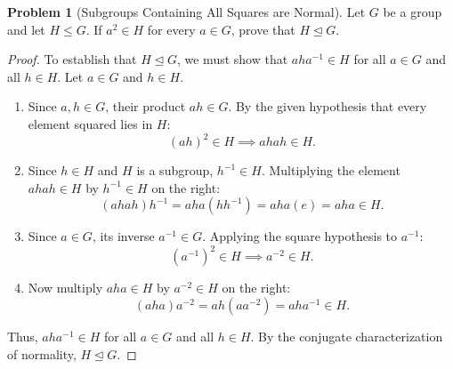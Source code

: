 \documentclass[12pt]{article}
\theoremstyle{definition}
\newtheorem{problem}[definition]{Problem}
\theoremstyle{plain}
\begin{document}
\begin{problem}[Subgroups Containing All Squares are Normal]
Let $G$ be a group and let $H \le G$. If $a^2 \in H$ for every $a \in G$, prove that $H \trianglelefteq G$.
\end{problem}
\begin{proof}
To establish that $H \trianglelefteq G$, we must show that $aha^{-1} \in H$ for all $a \in G$ and all $h \in H$.
Let $a \in G$ and $h \in H$.
\begin{enumerate}
    \item Since $a, h \in G$, their product $ah \in G$. By the given hypothesis that every element squared lies in $H$:
    \[
    (ah)^2 \in H \implies ahah \in H.
    \]
    
    \item Since $h \in H$ and $H$ is a subgroup, $h^{-1} \in H$.
    Multiplying the element $ahah \in H$ by $h^{-1} \in H$ on the right:
    \[
    (ahah)h^{-1} = aha(hh^{-1}) = aha(e) = aha \in H.
    \]
    
    \item Since $a \in G$, its inverse $a^{-1} \in G$. Applying the square hypothesis to $a^{-1}$:
    \[
    (a^{-1})^2 \in H \implies a^{-2} \in H.
    \]
    
    \item Now multiply $aha \in H$ by $a^{-2} \in H$ on the right:
    \[
    (aha)a^{-2} = ah(a a^{-2}) = aha^{-1} \in H.
    \]
\end{enumerate}
Thus, $aha^{-1} \in H$ for all $a \in G$ and all $h \in H$.
By the conjugate characterization of normality, $H \trianglelefteq G$.
\end{proof}
\end{document}
